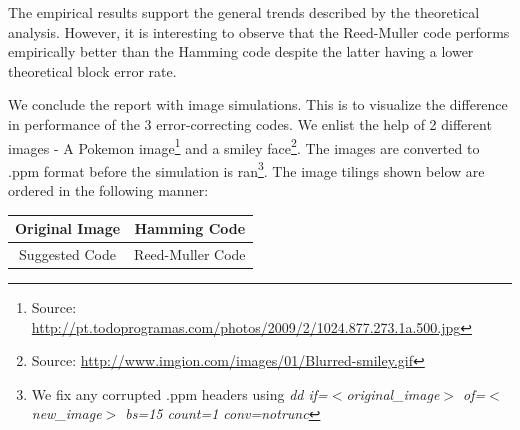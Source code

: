 \documentclass[12pt, a4paper]{article}
\begin{document}
The empirical results support the general trends described by the theoretical analysis. However, it is interesting to observe that the Reed-Muller code performs empirically better than the Hamming code despite the latter having a lower theoretical block error rate.

We conclude the report with image simulations. This is to visualize the difference in performance of the 3 error-correcting codes. We enlist the help of 2 different images - A Pokemon image\footnote{Source: \url{http://pt.todoprogramas.com/photos/2009/2/1024.877.273.1a.500.jpg}} and a smiley face\footnote{Source: \url{http://www.imgion.com/images/01/Blurred-smiley.gif}}. The images are converted to .ppm format before the simulation is ran\footnote{We fix any corrupted .ppm headers using \textit{dd if=$<$original\_image$>$ of=$<$new\_image$>$ bs=15 count=1 conv=notrunc}}. The image tilings shown below are ordered in the following manner:

\begin{table}[H]
\centering
\begin{tabular}{|c|c|}
\hline
Original Image & Hamming Code\\
\hline
Suggested Code & Reed-Muller Code\\
\hline
\end{tabular}
\end{table}
\end{document}
